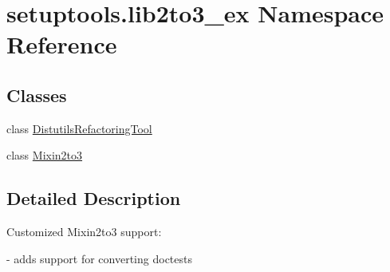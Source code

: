 \hypertarget{namespacesetuptools_1_1lib2to3__ex}{}\section{setuptools.\+lib2to3\+\_\+ex Namespace Reference}
\label{namespacesetuptools_1_1lib2to3__ex}
\subsection*{Classes}
\begin{DoxyCompactItemize}
\item 
class \hyperlink{classsetuptools_1_1lib2to3__ex_1_1DistutilsRefactoringTool}{Distutils\+Refactoring\+Tool}
\item 
class \hyperlink{classsetuptools_1_1lib2to3__ex_1_1Mixin2to3}{Mixin2to3}
\end{DoxyCompactItemize}


\subsection{Detailed Description}
\begin{DoxyVerb}Customized Mixin2to3 support:

 - adds support for converting doctests
\end{DoxyVerb}
 